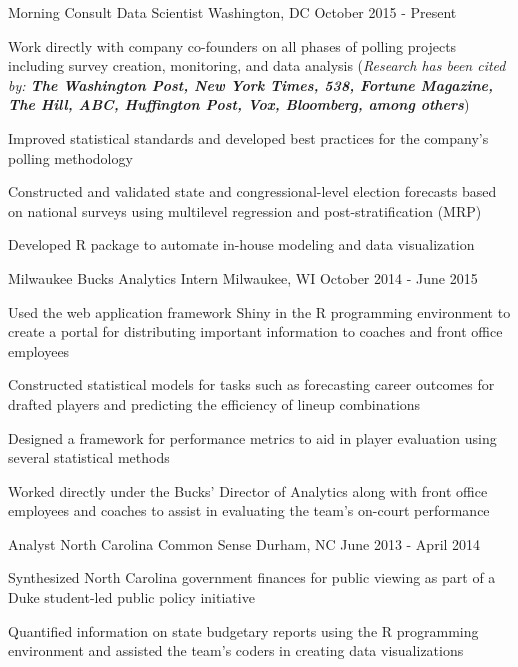 \documentclass[11pt, a4paper]{awesome-cv}
\begin{document}
\begin{cventries}
  \cventry
    {Morning Consult}
    {Data Scientist}
    {Washington, DC}
    {October 2015 - Present}
    {
      \begin{cvitems}
        \item{Work directly with company co-founders on all phases of polling projects including survey creation,
        monitoring, and data analysis (\textit{Research has been cited by: \textbf{The Washington Post, New York Times, 538, Fortune Magazine, The Hill, ABC, Huffington Post, Vox, Bloomberg, among others}})}
        \item{Improved statistical standards and developed best practices for the company’s polling methodology}
        \item{Constructed and validated state and congressional-level election forecasts based on national surveys using multilevel regression and post-stratification (MRP)}
        \item{Developed R package to automate in-house modeling and data visualization}
      \end{cvitems}
    }
  \cventry
    {Milwaukee Bucks}
    {Analytics Intern}
    {Milwaukee, WI}
    {October 2014 - June 2015}
    {
      \begin{cvitems}
        \item{Used the web application framework Shiny in the R programming environment to create a portal for distributing important information to coaches and front office employees}
        \item{Constructed statistical models for tasks such as forecasting career outcomes for drafted players
and predicting the efficiency of lineup combinations}
         \item{Designed a framework for performance metrics to aid in player evaluation using several statistical
methods}
        \item{Worked directly under the Bucks’ Director of Analytics along with front office employees and
coaches to assist in evaluating the team’s on-court performance}
      \end{cvitems}
    }
  \cventry
    {Analyst}
    {North Carolina Common Sense}
    {Durham, NC}
    {June 2013 - April 2014}
    {
      \begin{cvitems}
        \item{Synthesized North Carolina government finances for public viewing as part of a Duke student-led
public policy initiative}
        \item{Quantified information on state budgetary reports using the R programming environment and
assisted the team’s coders in creating data visualizations}
      \end{cvitems} 
    }
    

\end{cventries}
\end{document}
